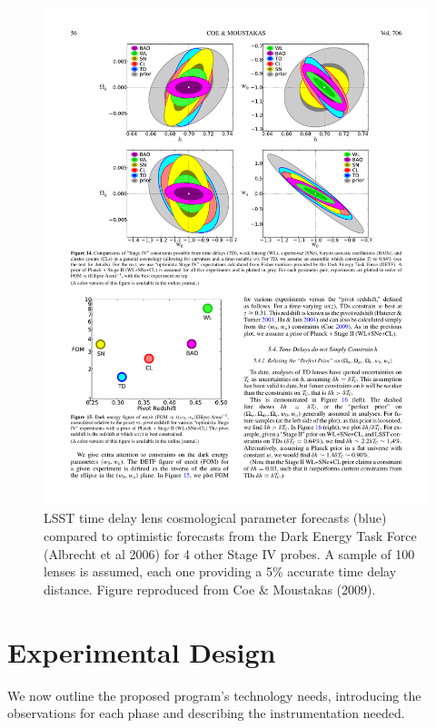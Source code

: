 \begin{figure}[!t]
    \centering\includegraphics[width=0.9\linewidth]{figs/Coe+Moustakas2009_Figure14.pdf}
    \caption{LSST time delay lens cosmological parameter forecasts (blue)
    compared to optimistic forecasts from the Dark
    Energy Task Force (Albrecht et al 2006) for 4 other Stage IV probes.
    A sample of 100 lenses is assumed, each one
    providing a 5\% accurate time delay distance. Figure reproduced from
    Coe \& Moustakas (2009).}
    \label{fig:sl_forecast}
\end{figure}


\section{Experimental Design}
\label{sec:sl_design}

We now outline the proposed program's technology needs, introducing the
observations for each phase and describing the  instrumentation needed.


